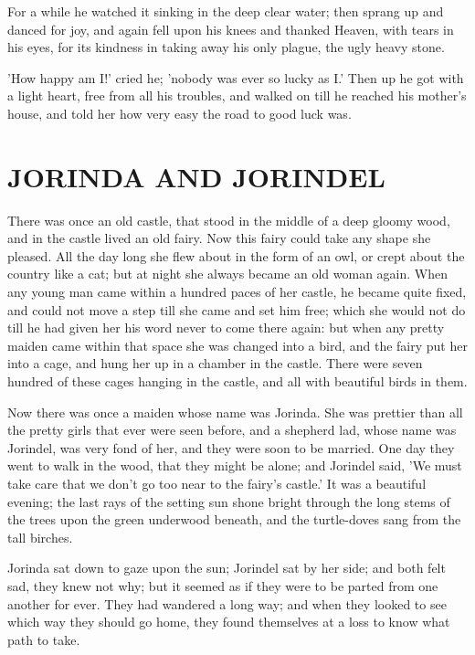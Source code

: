 \documentclass[12pt]{book}
\begin{document}
For a while he watched it sinking in the deep clear water; then sprang
up and danced for joy, and again fell upon his knees and thanked
Heaven, with tears in his eyes, for its kindness in taking away his
only plague, the ugly heavy stone.

'How happy am I!' cried he; 'nobody was ever so lucky as I.' Then up
he got with a light heart, free from all his troubles, and walked on
till he reached his mother's house, and told her how very easy the
road to good luck was.



\chapter{JORINDA AND JORINDEL}

There was once an old castle, that stood in the middle of a deep
gloomy wood, and in the castle lived an old fairy. Now this fairy
could take any shape she pleased. All the day long she flew about in
the form of an owl, or crept about the country like a cat; but at
night she always became an old woman again. When any young man came
within a hundred paces of her castle, he became quite fixed, and could
not move a step till she came and set him free; which she would not do
till he had given her his word never to come there again: but when any
pretty maiden came within that space she was changed into a bird, and
the fairy put her into a cage, and hung her up in a chamber in the
castle. There were seven hundred of these cages hanging in the castle,
and all with beautiful birds in them.

Now there was once a maiden whose name was Jorinda. She was prettier
than all the pretty girls that ever were seen before, and a shepherd
lad, whose name was Jorindel, was very fond of her, and they were soon
to be married. One day they went to walk in the wood, that they might
be alone; and Jorindel said, 'We must take care that we don't go too
near to the fairy's castle.' It was a beautiful evening; the last rays
of the setting sun shone bright through the long stems of the trees
upon the green underwood beneath, and the turtle-doves sang from the
tall birches.

Jorinda sat down to gaze upon the sun; Jorindel sat by her side; and
both felt sad, they knew not why; but it seemed as if they were to be
parted from one another for ever. They had wandered a long way; and
when they looked to see which way they should go home, they found
themselves at a loss to know what path to take.
\end{document}
